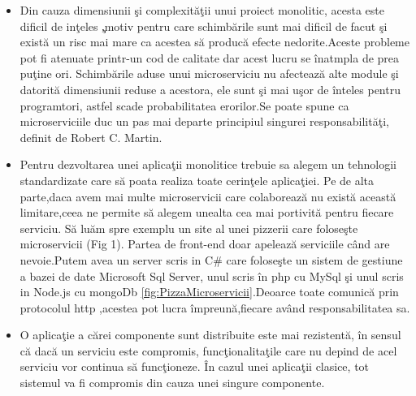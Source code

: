 \documentclass[a4paper,12pt]{report}
\begin{document}
\begin{itemize}
	\item Din cauza dimensiunii \c si complexit\u a\c tii unui proiect monolitic,
	      acesta este dificil de in\c teles \c ,motiv pentru care schimb\u arile sunt mai dificil de facut \c si exist\u a
	      un risc mai mare ca acestea s\u a produc\u a efecte nedorite.Aceste probleme pot fi atenuate printr-un
	      cod de calitate dar acest lucru se \^ inatmpla de prea pu\c tine ori. Schimb\u arile aduse unui microserviciu nu afecteaz\u a alte
	      module \c si datorit\u a dimensiunii reduse a acestora, ele sunt \c si mai u\c sor de \^inteles pentru programtori, astfel
	      scade probabilitatea erorilor.Se poate spune ca microserviciile duc un pas mai departe principiul singurei responsabilit\u a\c ti,
	      definit de Robert C. Martin.
	\item Pentru dezvoltarea unei aplica\c tii monolitice trebuie sa alegem un tehnologii standardizate care s\u a poata
          realiza toate cerin\c tele aplica\c tiei. Pe de alta parte,daca avem mai multe microservicii care colaboreaz\u a nu exist\u a 
          aceast\u a limitare,ceea ne permite s\u a alegem unealta cea mai portivit\u a pentru fiecare serviciu.
          S\u a lu\u am spre exemplu un site al unei pizzerii care folose\c ste microservicii (Fig 1).
          Partea de front-end doar apeleaz\u a serviciile c\^and are nevoie.Putem avea un server scris 
          in C\# care folose\c ste un sistem de gestiune a bazei de date Microsoft Sql Server,
          unul scris \^in php cu MySql \c si unul scris in Node.js cu mongoDb \ref{fig:PizzaMicroservicii}.Deoarce toate comunic\u a prin
          protocolul http ,acestea pot lucra \^impreun\u a,fiecare av\^and responsabilitatea sa.
    \item O aplica\c tie a c\u arei componente sunt distribuite este mai rezistent\u a, \^in sensul c\u a dac\u a un 
          serviciu este compromis, func\c tionalita\c tile care nu depind de acel serviciu vor continua s\u a func\c tioneze.
          \^In cazul unei aplica\c tii clasice, tot sistemul va fi compromis din cauza unei singure componente.
          
          

\end{itemize}
\end{document}
